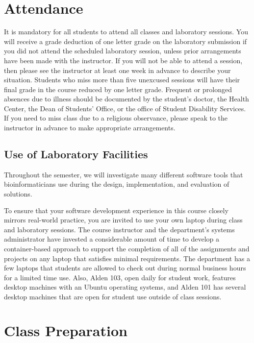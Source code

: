 \documentclass[11pt]{article} %
\begin{document}
\section*{\textbf{Attendance}}
It is mandatory for all students to attend all classes and laboratory sessions. You will receive a grade deduction of one letter grade on the laboratory submission if you did not attend the scheduled laboratory session, unless prior arrangements have been made with the instructor. If you will not be able to attend a session, then please see the instructor at least one week in advance to describe your situation. Students who miss more than five unexcused sessions will have their final grade in the course reduced by one letter grade. Frequent or prolonged absences due to illness should be documented by the student's doctor, the Health Center, the Dean of Students’ Office, or the office of Student Disability Services. If you need to miss class due to a religious observance, please speak to the instructor in advance to make appropriate arrangements.

\subsection*{\textbf{Use of Laboratory Facilities}}

Throughout the semester, we will investigate many different software tools that bioinformaticians use during the design, implementation, and evaluation of solutions. 

To ensure that your software development experience in this course closely mirrors real-world practice, you are invited to use your own laptop during class and laboratory sessions. The course instructor and the department's systems administrator have invested a considerable amount of time to develop a container-based approach to support the completion of all of the assignments and projects on any laptop that satisfies minimal requirements. The department has a few laptops that students are allowed to check out during normal business hours for a limited time use. Also, Alden 103, open daily for student work, features desktop machines with an Ubuntu operating systems, and Alden 101 has several desktop machines that are open for student use outside of class sessions.


\section*{\textbf{Class Preparation}}
\end{document}
